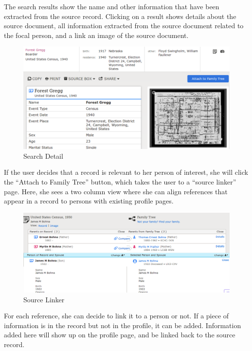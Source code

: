 \documentclass[format=siggraph, review=true]{acmart}
\begin{document}
The search results show the name and other information that have been
extracted from the source record. Clicking on a result shows details
about the source document, all information extracted from the source
document related to the focal person, and a link an image of the
source document.

\begin{figure}[h]
\includegraphics[width=\columnwidth]{images/familysearch/search_result_detail.png}
\caption{Search Detail}
\label{fig:search-details}
\end{figure}

If the user decides that a record is relevant to her person of
interest, she will click the ``Attach to Family Tree'' button, which
takes the user to a ``source linker'' page. Here, she sees a two
column view where she can align references that appear in a record to
persons with existing profile pages.

\begin{figure}[h]
\includegraphics[width=\columnwidth]{images/familysearch/source_linker.png}
\caption{Source Linker}
\label{fig:source-linker}
\end{figure}

For each reference, she can decide to link it to a person or not. If a
piece of information is in the record but not in the profile, it can
be added. Information added here will show up on the profile page, and
be linked back to the source record.
\end{document}
